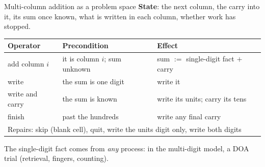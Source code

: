 \documentclass[aspectratio=169,11pt]{beamer}
\begin{document}
\begin{frame}{Multi-column addition as a problem space}
  \small
  \textbf{State}: the next column, the carry into it, its sum once known, what is written in each column, whether work has stopped.
  \medskip

  \begin{tabular}{lll}
    \toprule
    Operator & Precondition & Effect\\
    \midrule
    add column $i$ & it is column $i$; sum unknown & sum $:=$ single-digit fact $+$ carry\\
    write & the sum is one digit & write it\\
    write and carry & the sum is known & write its units; carry its tens\\
    finish & past the hundreds & write any final carry\\
    \midrule
    \multicolumn{3}{l}{Repairs: skip (blank cell), quit, write the units digit only, write both digits}\\
    \bottomrule
  \end{tabular}
  \medskip

  The single-digit fact comes from \emph{any} process: in the multi-digit model, a DOA trial (retrieval, fingers, counting).
\end{frame}
\end{document}
